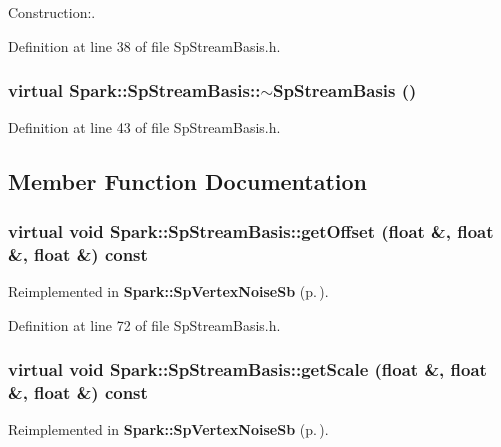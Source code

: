 Construction:. 

Definition at line 38 of file Sp\-Stream\-Basis.h.
\subsubsection{\setlength{\rightskip}{0pt plus 5cm}virtual Spark::Sp\-Stream\-Basis::$\sim${\bf Sp\-Stream\-Basis} ()\hspace{0.3cm}{\tt  [inline, virtual]}}\label{classSpark_1_1SpStreamBasis_a1}


Definition at line 43 of file Sp\-Stream\-Basis.h.

\subsection{Member Function Documentation}
\subsubsection{\setlength{\rightskip}{0pt plus 5cm}virtual void Spark::Sp\-Stream\-Basis::get\-Offset (float \&, float \&, float \&) const\hspace{0.3cm}{\tt  [inline, virtual]}}\label{classSpark_1_1SpStreamBasis_a7}




Reimplemented in {\bf Spark::Sp\-Vertex\-Noise\-Sb} {\rm (p.\,\pageref{classSpark_1_1SpVertexNoiseSb_a10})}.

Definition at line 72 of file Sp\-Stream\-Basis.h.
\subsubsection{\setlength{\rightskip}{0pt plus 5cm}virtual void Spark::Sp\-Stream\-Basis::get\-Scale (float \&, float \&, float \&) const\hspace{0.3cm}{\tt  [inline, virtual]}}\label{classSpark_1_1SpStreamBasis_a9}




Reimplemented in {\bf Spark::Sp\-Vertex\-Noise\-Sb} {\rm (p.\,\pageref{classSpark_1_1SpVertexNoiseSb_a8})}.

